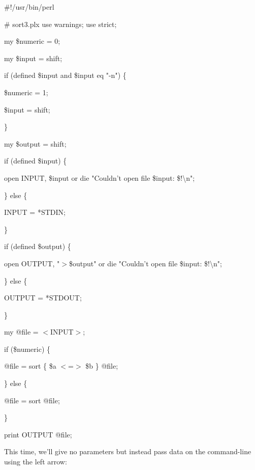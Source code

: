 \documentclass[a4paper,11pt]{book}
\begin{document}
\noindent 

\noindent 

\noindent \#!/usr/bin/perl

\noindent \# sort3.plx use warnings; use strict;

\noindent 

\noindent my \$numeric = 0;

\noindent my \$input = shift;

\noindent if (defined \$input and \$input eq "-n") \{

\noindent \$numeric = 1;

\noindent \$input = shift;

\noindent \}

\noindent my \$output = shift;

\noindent 

\noindent if (defined \$input) \{

\noindent open INPUT, \$input or die "Couldn't open file \$input: \$!\textbackslash n";

\noindent \} else \{

\noindent *INPUT = *STDIN;

\noindent \}

\noindent 

\noindent if (defined \$output) \{

\noindent open OUTPUT, "$>$\$output" or die "Couldn't open file \$input: \$!\textbackslash n";

\noindent \} else \{

\noindent *OUTPUT = *STDOUT;

\noindent \}

\noindent 

\noindent my @file = $<$INPUT$>$;

\noindent if (\$numeric) \{

\noindent @file = sort \{ \$a $<$=$>$ \$b \} @file;

\noindent \} else \{

\noindent @file = sort @file;

\noindent \}

\noindent 

\noindent print OUTPUT @file;

\noindent 

\noindent 

\noindent This time, we'll give no parameters but instead pass data on the command-line using the left arrow:

\noindent 
\end{document}
